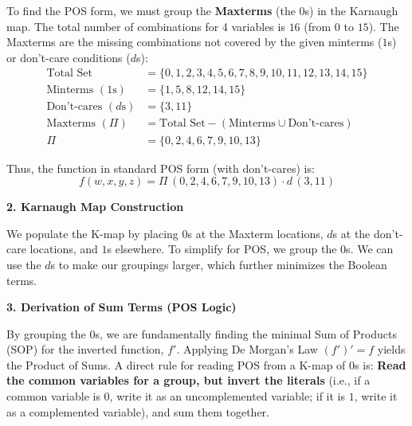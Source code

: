 \documentclass[12pt,a3paper]{article}
\begin{document}
\begin{enumerate}
\begin{tcolorbox}[enhanced,breakable,ansbox,colback=cC!4,colframe=cC,boxrule=0.8pt,arc=5pt,title={\textbf{Answer}},fonttitle=\bfseries\color{white},colbacktitle=cC]
To find the POS form, we must group the \textbf{Maxterms} (the $0$s) in the Karnaugh map. The total number of combinations for 4 variables is $16$ (from $0$ to $15$). 
The Maxterms are the missing combinations not covered by the given minterms ($1$s) or don't-care conditions ($d$s):
\begin{align*}
    \text{Total Set} &= \{0, 1, 2, 3, 4, 5, 6, 7, 8, 9, 10, 11, 12, 13, 14, 15\} \\
    \text{Minterms } (1\text{s}) &= \{1, 5, 8, 12, 14, 15\} \\
    \text{Don't-cares } (d\text{s}) &= \{3, 11\} \\
    \text{Maxterms } (\Pi) &= \text{Total Set} - (\text{Minterms} \cup \text{Don't-cares}) \\
    \Pi &= \{0, 2, 4, 6, 7, 9, 10, 13\}
\end{align*}

Thus, the function in standard POS form (with don't-cares) is:
\[ f(w,x,y,z) = \Pi\,(0, 2, 4, 6, 7, 9, 10, 13) \cdot d\,(3, 11) \]

\vspace{1em}
\textbf{2. Karnaugh Map Construction}

We populate the K-map by placing $0$s at the Maxterm locations, $d$s at the don't-care locations, and $1$s elsewhere. To simplify for POS, we group the $0$s. We can use the $d$s to make our groupings larger, which further minimizes the Boolean terms.

\begin{center}
\begin{karnaugh-map}[4][4][1][$yz$][$wx$]
    
\end{karnaugh-map}
\end{center}

\vspace{1em}
\textbf{3. Derivation of Sum Terms (POS Logic)}

By grouping the $0$s, we are fundamentally finding the minimal Sum of Products (SOP) for the inverted function, $f'$. Applying De Morgan's Law $(f')' = f$ yields the Product of Sums. 
A direct rule for reading POS from a K-map of $0$s is: \textbf{Read the common variables for a group, but invert the literals} (i.e., if a common variable is $0$, write it as an uncomplemented variable; if it is $1$, write it as a complemented variable), and sum them together.


\end{tcolorbox}
\end{enumerate}
\end{document}
